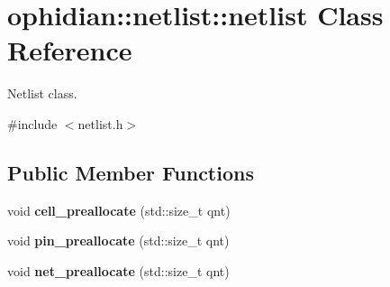 \hypertarget{classophidian_1_1netlist_1_1netlist}{\section{ophidian\-:\-:netlist\-:\-:netlist Class Reference}
\label{classophidian_1_1netlist_1_1netlist}
}


Netlist class.  




{\ttfamily \#include $<$netlist.\-h$>$}

\subsection*{Public Member Functions}
\begin{DoxyCompactItemize}
\item 
\hypertarget{classophidian_1_1netlist_1_1netlist_a3ced636840014d63d7fb10cfcbc34609}{void {\bfseries cell\-\_\-preallocate} (std\-::size\-\_\-t qnt)}\label{classophidian_1_1netlist_1_1netlist_a3ced636840014d63d7fb10cfcbc34609}

\item 
\hypertarget{classophidian_1_1netlist_1_1netlist_a58b97bfb33b6d71483904036c63a0e2b}{void {\bfseries pin\-\_\-preallocate} (std\-::size\-\_\-t qnt)}\label{classophidian_1_1netlist_1_1netlist_a58b97bfb33b6d71483904036c63a0e2b}

\item 
\hypertarget{classophidian_1_1netlist_1_1netlist_abf48e0d6212baaeb042882c546c5be93}{void {\bfseries net\-\_\-preallocate} (std\-::size\-\_\-t qnt)}\label{classophidian_1_1netlist_1_1netlist_abf48e0d6212baaeb042882c546c5be93}


\end{DoxyCompactItemize}
